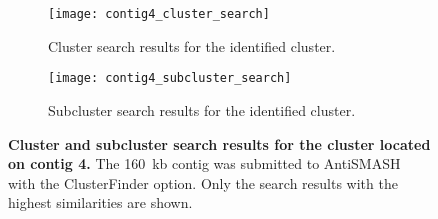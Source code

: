     \begin{figure}[htpb]
        \centering
        \begin{subfigure}[b]{\textwidth}
            \texttt{[image: contig4\_cluster\_search]}
            \caption{Cluster search results for the identified cluster.}
            \label{fig:sub1}
        \end{subfigure}

        \begin{subfigure}[b]{\textwidth}
            \texttt{[image: contig4\_subcluster\_search]}
            \caption{Subcluster search results for the identified cluster.}
            \label{fig:sub2}
        \end{subfigure}

        \caption[Cluster and subcluster search results for the cluster located on contig 4.]{\textbf{Cluster and subcluster search results for the cluster located on contig 4.} The 160~kb contig was submitted to AntiSMASH with the ClusterFinder option. Only the search results with the highest similarities are shown.}
        \label{fig:cluster_search}
    \end{figure}

